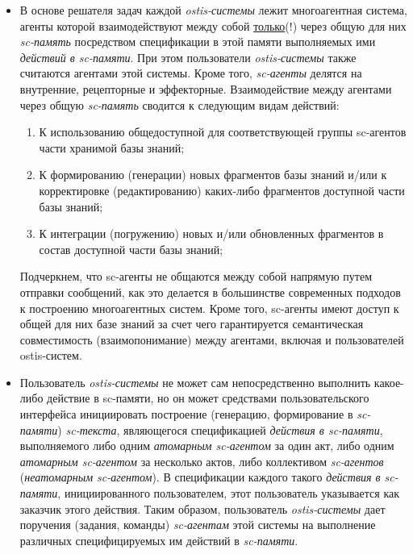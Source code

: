 \begin{itemize}
\item В основе решателя задач каждой \textit{ostis-системы} лежит многоагентная система, агенты которой взаимодействуют между собой \uline{только}(!) через общую для них \textit{sc-память} посредством спецификации в этой памяти выполняемых ими \textit{действий в sc-памяти}. При этом пользователи \textit{ostis-системы} также считаются агентами этой системы. Кроме того, \textit{sc-агенты} делятся на внутренние, рецепторные и эффекторные. Взаимодействие между агентами через общую \textit{sc-память} сводится к следующим видам действий:
\begin{enumerate}
		\item К использованию общедоступной для соответствующей группы sc-агентов части хранимой базы знаний;
		\item К формированию (генерации) новых фрагментов базы знаний и/или к корректировке (редактированию) каких-либо фрагментов доступной части базы знаний;
		\item К интеграции (погружению) новых и/или обновленных фрагментов в состав доступной части базы знаний;
\end{enumerate}

Подчеркнем, что sc-агенты не общаются между собой напрямую путем отправки сообщений, как это делается в большинстве современных подходов к построению многоагентных систем. Кроме того, sc-агенты имеют доступ к общей для них базе знаний за счет чего гарантируется семантическая совместимость (взаимопонимание) между агентами, включая и пользователей ostis-систем.

\item Пользователь \textit{ostis-системы} не может сам непосредственно выполнить какое-либо действие в \mbox{sc-памяти}, но он может средствами пользовательского интерфейса инициировать построение (генерацию, формирование в \textit{sc-памяти}) \textit{sc-текста}, являющегося спецификацией \textit{действия в \mbox{sc-памяти}}, выполняемого либо одним \textit{атомарным sc-агентом} за один акт, либо одним \textit{атомарным sc-агентом} за несколько актов, либо коллективом \textit{sc-агентов} (\textit{неатомарным sc-агентом}). В спецификации каждого такого \textit{действия в sc-памяти}, инициированного пользователем, этот пользователь указывается как заказчик этого действия. Таким образом, пользователь \textit{ostis-системы} дает поручения (задания, команды) \textit{sc-агентам} этой системы на выполнение различных специфицируемых им действий в \textit{sc-памяти}.


\end{itemize}
